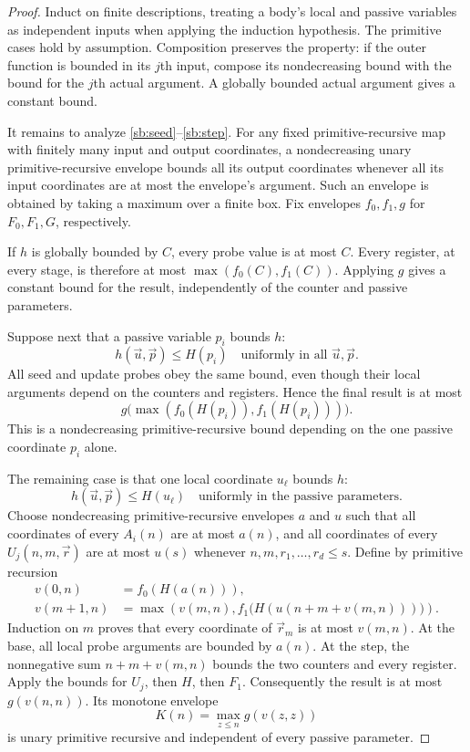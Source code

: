 \begin{proof}
Induct on finite descriptions, treating a body's local and passive
variables as independent inputs when applying the induction hypothesis.
The primitive cases hold by assumption.  Composition preserves the
property: if the outer function is bounded in its $j$th input, compose
its nondecreasing bound with the bound for the $j$th actual argument.
A globally bounded actual argument gives a constant bound.

It remains to analyze \eqref{sb:seed}--\eqref{sb:step}.  For any fixed
primitive-recursive map with finitely many input and output coordinates,
a nondecreasing unary primitive-recursive envelope bounds all its output
coordinates whenever all its input coordinates are at most the envelope's
argument.  Such an envelope is obtained by taking a maximum over a finite
box.  Fix envelopes $f_0,f_1,g$ for $F_0,F_1,G$, respectively.

If $h$ is globally bounded by $C$, every probe value is at most $C$.
Every register, at every stage, is therefore at most
$\max(f_0(C),f_1(C))$.  Applying $g$ gives a constant bound for the
result, independently of the counter and passive parameters.

Suppose next that a passive variable $p_i$ bounds $h$:
\[
       h(\vec u,\vec p)\le H(p_i)
       \quad\text{uniformly in all }\vec u,\vec p.
\]
All seed and update probes obey the same bound, even though their local
arguments depend on the counters and registers.  Hence the final result
is at most
\[
       g\bigl(\max(f_0(H(p_i)),f_1(H(p_i)))\bigr).
\]
This is a nondecreasing primitive-recursive bound depending on the one
passive coordinate $p_i$ alone.

The remaining case is that one local coordinate $u_\ell$ bounds $h$:
\[
       h(\vec u,\vec p)\le H(u_\ell)
       \quad\text{uniformly in the passive parameters.}
\]
Choose nondecreasing primitive-recursive envelopes $a$ and $u$ such that
all coordinates of every $A_i(n)$ are at most $a(n)$, and all coordinates
of every $U_j(n,m,\vec r)$ are at most $u(s)$ whenever
$n,m,r_1,\ldots,r_d\le s$.  Define by primitive recursion
\[
 \begin{aligned}
 v(0,n)&=f_0(H(a(n))),\\
 v(m+1,n)&=\max\left(v(m,n),
       f_1\bigl(H(u(n+m+v(m,n)))\bigr)\right).
 \end{aligned}
\]
Induction on $m$ proves that every coordinate of $\vec r_m$ is at most
$v(m,n)$.  At the base, all local probe arguments are bounded by $a(n)$.
At the step, the nonnegative sum $n+m+v(m,n)$ bounds the two counters and
every register.  Apply the bounds for $U_j$, then $H$, then $F_1$.
Consequently the result is at most $g(v(n,n))$.  Its monotone envelope
\[
                 K(n)=\max_{z\le n}g(v(z,z))
\]
is unary primitive recursive and independent of every passive parameter.


\end{proof}
